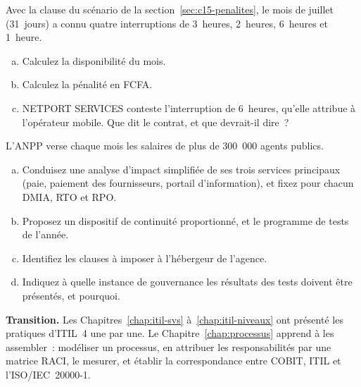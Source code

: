 \begin{boxexo}[title={\ding{45}\quad Exercice~15.2. Les pénalités de juillet \niveaumoyen}]
Avec la clause du scénario de la section~\ref{sec:c15-penalites}, le mois
de juillet (31~jours) a connu quatre interruptions de 3~heures,
2~heures, 6~heures et 1~heure.
\begin{enumerate}[(a)]
    \item Calculez la disponibilité du mois.
    \item Calculez la pénalité en FCFA.
    \item NETPORT SERVICES conteste l'interruption de 6~heures, qu'elle
          attribue à l'opérateur mobile. Que dit le contrat, et que
          devrait-il dire~?
\end{enumerate}
\end{boxexo}

\begin{boxexo}[title={\ding{45}\quad Exercice~15.3. La continuité de l'ANPP \niveauexpert}]
L'ANPP verse chaque mois les salaires de plus de 300~000 agents publics.
\begin{enumerate}[(a)]
    \item Conduisez une analyse d'impact simplifiée de ses trois services
          principaux (paie, paiement des fournisseurs, portail
          d'information), et fixez pour chacun DMIA, RTO et RPO.
    \item Proposez un dispositif de continuité proportionné, et le programme
          de tests de l'année.
    \item Identifiez les clauses à imposer à l'hébergeur de l'agence.
    \item Indiquez à quelle instance de gouvernance les résultats des tests
          doivent être présentés, et pourquoi.
\end{enumerate}
\end{boxexo}

\bigskip

\begin{boxinfo}
\textbf{Transition.} Les Chapitres~\ref{chap:itil-svs} à~\ref{chap:itil-niveaux}
ont présenté les pratiques d'ITIL~4 une par une. Le
Chapitre~\ref{chap:processus} apprend à les assembler~: modéliser un
processus, en attribuer les responsabilités par une matrice RACI, le
mesurer, et établir la correspondance entre COBIT, ITIL et
l'ISO/IEC~20000-1.
\end{boxinfo}
